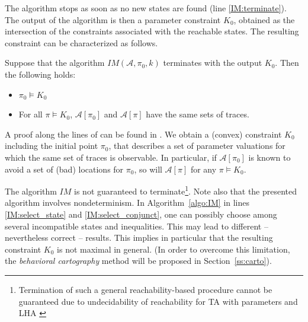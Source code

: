 \documentclass{llncs}
\newcommand{\IM}{\ensuremath{\mathit{IM}}}
\newcommand{\A}{\ensuremath{\mathcal{A}}}
\begin{document}
The algorithm stops as soon as no new states are found (line
\ref{IM:terminate}). The output of the algorithm is then a parameter
constraint $K_0$, obtained as the intersection of the constraints
associated with the reachable states.  The resulting constraint can be
characterized as follows.

\begin{proposition}
  Suppose that the algorithm $\IM(\A, \pi_0, k)$ terminates with the
  output $K_0$. Then the following holds:
  \begin{itemize}
  \item $\pi_0 \models K_0$
  \item For all $\pi \models K_0$, $\A[\pi_0]$ and $\A[\pi]$ have the same sets of traces.
  \end{itemize}
\end{proposition}

A proof along the lines of \cite{HRSV:2002} can be found in
\cite{FK:2011}. 
We obtain a (convex) constraint $K_0$
including the initial point $\pi_0$, that describes a set of parameter
valuations for which the same set of traces is observable. In
particular, if $\A[\pi_0]$ is known to avoid a set of (bad) locations
for $\pi_0$, so will $\A[\pi]$ for any $\pi \models K_0$.


The algorithm $\IM$ is not guaranteed to
terminate\footnote{Termination of such a general reachability-based
  procedure cannot be guaranteed due to undecidability of reachability
  for TA with parameters and LHA \cite{HKPV:95}}.  Note also that the
presented algorithm involves nondeterminism. In
Algorithm~\ref{algo:IM} in lines \ref{IM:select_state} and
\ref{IM:select_conjunct}, one can possibly choose among several
incompatible states and inequalities. This may lead to different --
nevertheless correct -- results. This implies in particular that the
resulting constraint $K_0$ is not maximal in general. (In order to
overcome this limitation, the \emph{behavioral cartography} method
will be proposed in  Section~\ref{ss:carto}).

\end{document}
